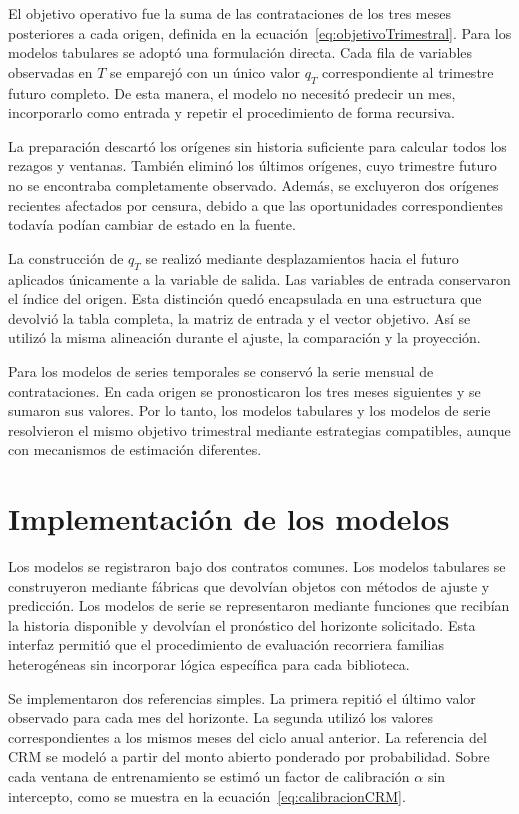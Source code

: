 El objetivo operativo fue la suma de las contrataciones de los tres meses posteriores a cada origen, definida en la ecuación~\ref{eq:objetivoTrimestral}. Para los modelos tabulares se adoptó una formulación directa. Cada fila de variables observadas en $T$ se emparejó con un único valor $q_T$ correspondiente al trimestre futuro completo. De esta manera, el modelo no necesitó predecir un mes, incorporarlo como entrada y repetir el procedimiento de forma recursiva.

La preparación descartó los orígenes sin historia suficiente para calcular todos los rezagos y ventanas. También eliminó los últimos orígenes, cuyo trimestre futuro no se encontraba completamente observado. Además, se excluyeron dos orígenes recientes afectados por censura, debido a que las oportunidades correspondientes todavía podían cambiar de estado en la fuente.

La construcción de $q_T$ se realizó mediante desplazamientos hacia el futuro aplicados únicamente a la variable de salida. Las variables de entrada conservaron el índice del origen. Esta distinción quedó encapsulada en una estructura que devolvió la tabla completa, la matriz de entrada y el vector objetivo. Así se utilizó la misma alineación durante el ajuste, la comparación y la proyección.

Para los modelos de series temporales se conservó la serie mensual de contrataciones. En cada origen se pronosticaron los tres meses siguientes y se sumaron sus valores. Por lo tanto, los modelos tabulares y los modelos de serie resolvieron el mismo objetivo trimestral mediante estrategias compatibles, aunque con mecanismos de estimación diferentes.

\section{Implementación de los modelos}
\label{sec:implementacionModelos}

Los modelos se registraron bajo dos contratos comunes. Los modelos tabulares se construyeron mediante fábricas que devolvían objetos con métodos de ajuste y predicción. Los modelos de serie se representaron mediante funciones que recibían la historia disponible y devolvían el pronóstico del horizonte solicitado. Esta interfaz permitió que el procedimiento de evaluación recorriera familias heterogéneas sin incorporar lógica específica para cada biblioteca.

Se implementaron dos referencias simples. La primera repitió el último valor observado para cada mes del horizonte. La segunda utilizó los valores correspondientes a los mismos meses del ciclo anual anterior. La referencia del CRM se modeló a partir del monto abierto ponderado por probabilidad. Sobre cada ventana de entrenamiento se estimó un factor de calibración $\alpha$ sin intercepto, como se muestra en la ecuación~\ref{eq:calibracionCRM}.

